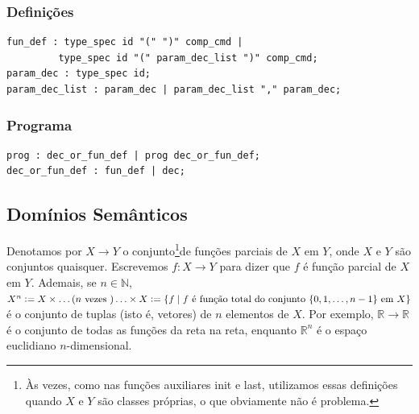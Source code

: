 \documentclass[12pt]{article}
\newcommand{\defeq}{\vcentcolon=}
\begin{document}
\subsubsection{Definições}

\begin{verbatim}
fun_def : type_spec id "(" ")" comp_cmd |
         type_spec id "(" param_dec_list ")" comp_cmd;
param_dec : type_spec id;
param_dec_list : param_dec | param_dec_list "," param_dec;
\end{verbatim}

\subsubsection{Programa}

\begin{verbatim}
prog : dec_or_fun_def | prog dec_or_fun_def;
dec_or_fun_def : fun_def | dec;
\end{verbatim}

\subsection{Domínios Semânticos}

Denotamos por $X \rightarrow Y$ o conjunto\footnote{Às vezes, como nas funções auxiliares init e last, utilizamos essas definições quando $X$ e $Y$ são classes próprias, o que obviamente não é problema.}de funções parciais de $X$ em $Y$, onde $X$ e $Y$ são conjuntos quaisquer. Escrevemos $f:X \rightarrow Y$ para dizer que $f$ é função parcial de $X$ em $Y$. Ademais, se $n\in\mathbb{N}$, $X^n \defeq X \times \ldots (n \text{ vezes }) \ldots \times X \defeq \{f \mid f \text{ é função total do conjunto } \{0, 1, \ldots, n-1\}\text{ em } X\}$ é o conjunto de tuplas (isto é, vetores) de $n$ elementos de $X$. Por exemplo, $\mathbb{R}\to\mathbb{R}$ é o conjunto de todas as funções da reta na reta, enquanto $\mathbb{R}^n$ é o espaço euclidiano $n$-dimensional.
\end{document}
